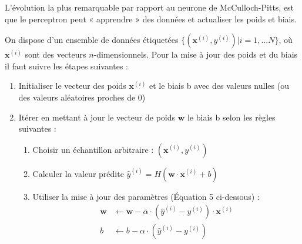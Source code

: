 \par{L'évolution la plus remarquable par rapport au neurone de McCulloch-Pitts, est que le perceptron peut « apprendre » des données et actualiser les poids et biais.}
\par{On dispose d'un ensemble de données étiquetées $\{(\mathbf{x}^{(i)}, y^{(i)})| i = 1, ... N\}$, où $\mathbf{x}^{(i)}$ sont des vecteurs $n$-dimensionnels. Pour la mise à jour des poids et du biais il faut suivre les étapes suivantes :}
\begin{enumerate}
    \item Initialiser le vecteur des poids $\mathbf{x}^{(i)}$ et le biais b avec des valeurs nulles (ou des valeurs aléatoires proches de 0)
    \item Itérer en mettant à jour le vecteur de poids $\mathbf{w}$ le biais b selon les règles suivantes :
    \begin{enumerate}
        \item Choisir un échantillon arbitraire : $(\mathbf{x}^{(i)}, y^{(i)})$
        \item Calculer la valeur prédite $\hat{y}^{(i)} = H(\mathbf{w} \cdot \mathbf{x}^{(i)} + b)$
        \item Utiliser la mise à jour des paramètres (Équation 5 ci-dessous) :
        \begin{align}
            \mathbf{w} &\leftarrow \mathbf{w} - \alpha \cdot (\hat{y}^{(i)} - y^{(i)}) \cdot \mathbf{x}^{(i)} \\
            b &\leftarrow b - \alpha \cdot (\hat{y}^{(i)} - y^{(i)})
        \end{align}
    \end{enumerate}
\end{enumerate}

